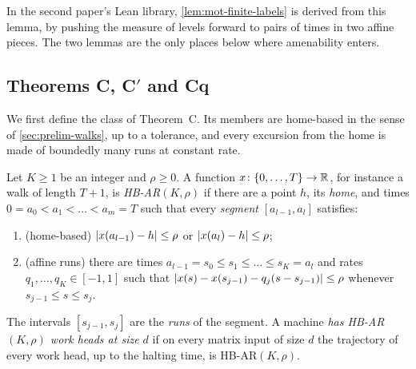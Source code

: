 In the second paper's Lean library, \cref{lem:mot-finite-labels} is derived from this lemma, by pushing the measure of
levels forward to pairs of times in two affine pieces. The two lemmas are the only places below where amenability
enters.

\subsection{Theorems C, C\texorpdfstring{$'$}{'} and Cq}\label{sec:mot-statements}

We first define the class of Theorem~C. Its members are home-based in the sense of \cref{sec:prelim-walks}, up to a
tolerance, and every excursion from the home is made of boundedly many runs at constant rate.

\begin{definition}\label{def:mot-hbar}
Let $K\ge1$ be an integer and $\rho\ge0$. A function $x\colon\{0,\dots,T\}\to\mathbb{R}$, for instance a walk of length $T+1$, is
\emph{HB-AR$(K,\rho)$} if there are a point $h$, its \emph{home}, and times $0=a_0<a_1<\dots<a_m=T$ such that every
\emph{segment} $[a_{l-1},a_l]$ satisfies:
\begin{enumerate}[label=(\roman*)]
\item (home-based) $\lvert x(a_{l-1})-h \rvert\le\rho$ or $\lvert x(a_l)-h \rvert\le\rho$;
\item (affine runs) there are times $a_{l-1}=s_0\le s_1\le\dots\le s_K=a_l$ and rates $q_1,\dots,q_K\in[-1,1]$ such
that $\lvert x(s)-x(s_{j-1})-q_j(s-s_{j-1}) \rvert\le\rho$ whenever $s_{j-1}\le s\le s_j$.
\end{enumerate}
The intervals $[s_{j-1},s_j]$ are the \emph{runs} of the segment. A machine \emph{has HB-AR$(K,\rho)$ work heads at
size $d$} if on every matrix input of size $d$ the trajectory of every work head, up to the halting time, is
HB-AR$(K,\rho)$.
\end{definition}

